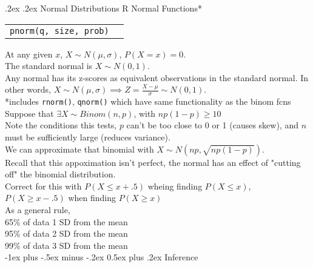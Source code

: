 \documentclass[10pt,landscape]{article}
\makeatletter
\renewcommand{\section}{\@startsection{section}{1}{0mm}%
                                {-1ex plus -.5ex minus -.2ex}%
                                {0.5ex plus .2ex}%
                                {\normalfont\large\bfseries}}
\renewcommand{\subsection}{\@startsection{subsection}{2}{0mm}%
                                {.2ex}%
                                {.2ex}%
                                {\normalfont\normalsize\bfseries}}
\makeatother
\begin{document}
\begin{multicols}{3}
\subsection{Normal Distributions}
R Normal Functions*
\begin{tabular}{@{}p{\the\MyLen}%
                @{}p{\linewidth-\the\MyLen}@{}}
\verb!pnorm(q, size, prob)! & \hskip3em $P(X< \verb!q!)$ \\
\end{tabular}
At any given $x$, $X \sim N(\mu, \sigma)$, $P(X = x) = 0$. \\
The standard normal is $X \sim N(0, 1)$. \\
Any normal has its z-scores as equivalent observations in the standard normal.
In other words, $X \sim N(\mu, \sigma) \implies Z = \frac{X - \mu}{\sigma} \sim N(0, 1)$. \\
*includes \verb!rnorm()!, \verb!qnorm()! which have same functionality as the binom fcns \\
Suppose that $\exists X \sim Binom(n, p)$, with $np(1 - p) \geq 10$ \\
Note the conditions this tests, $p$ can't be too close to 0 or 1 (causes skew), and $n$ must be sufficiently large (reduces variance). \\
We can approximate that binomial with $X \sim N(np, \sqrt{np(1 - p)})$. \\
Recall that this appoximation isn't perfect, the normal has an effect of "cutting off" the binomial distribution. \\
Correct for this with $P(X \leq x + .5)$ wheing finding $P(X \leq x)$, $P(X \geq x - .5)$ when finding $P(X \geq x)$ \\
As a general rule, \\
65\% of data 1 SD from the mean \\
95\% of data 2 SD from the mean \\
99\% of data 3 SD from the mean \\
\section{Inference}


\end{multicols}
\end{document}

